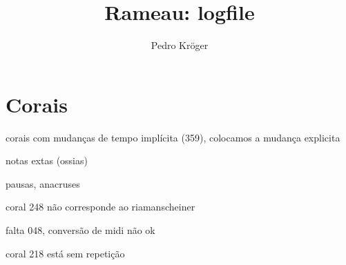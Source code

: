 \documentclass[12pt,brazil]{article}
\title{Rameau: logfile}
\author{Pedro Kröger}
\begin{document}
\graphicspath{{figs/}}

\maketitle

\section{Corais}
\label{sec:corais}

corais com mudanças de tempo implícita (359), colocamos a mudança
explicita

notas extas (ossias)

pausas, anacruses

coral 248 não corresponde ao riamanscheiner

falta 048, conversão de midi não ok

coral 218 está sem repetição
\end{document}
